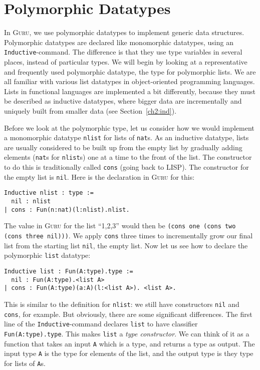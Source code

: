 \documentclass{book}[12pt]
\newcommand{\guru}[0]{\textsc{Guru}\xspace}
\begin{document}
\section{Polymorphic Datatypes}
\label{ch6:lists}

In \guru, we use polymorphic datatypes to implement generic data
structures.  Polymorphic datatypes are declared like monomorphic
datatypes, using an \texttt{Inductive}-command.  The difference is
that they use type variables in several places, instead of particular
types.  We will begin by looking at a representative and frequently
used polymorphic datatype, the type for polymorphic lists.  We are all
familiar with various list datatypes in object-oriented programming
languages.  Lists in functional languages are implemented a bit
differently, because they must be described as inductive datatypes,
where bigger data are incrementally and uniquely built from smaller
data (see Section~\ref{ch2:ind}).  

Before we look at the polymorphic type, let us consider how we would
implement a monomorphic datatype \texttt{nlist} for lists of
\texttt{nat}s.  As an inductive datatype, lists are usually considered
to be built up from the empty list by gradually adding elements
(\texttt{nat}s for \texttt{nlist}s) one at a time to the front of the
list.  The constructor to do this is traditionally called
\texttt{cons} (going back to \textsc{LISP}).  The constructor for the
empty list is \texttt{nil}.  Here is the declaration in \guru for
this:

\begin{verbatim}
Inductive nlist : type :=
  nil : nlist
| cons : Fun(n:nat)(l:nlist).nlist.
\end{verbatim}

\noindent The value in \guru for the list ``1,2,3'' would then be
\texttt{(cons one (cons two (cons three nil)))}.  We apply
\texttt{cons} three times to incrementally grow our final list from
the starting list \texttt{nil}, the empty list.  Now let us see how to
declare the polymorphic \texttt{list} datatype:

\begin{verbatim}
Inductive list : Fun(A:type).type :=
  nil : Fun(A:type).<list A>
| cons : Fun(A:type)(a:A)(l:<list A>). <list A>.
\end{verbatim}

\noindent This is similar to the definition for \texttt{nlist}: we
still have constructors \texttt{nil} and \texttt{cons}, for example.
But obviously, there are some significant differences.  The first line
of the \texttt{Inductive}-command declares \texttt{list} to have
classifier \texttt{Fun(A:type).type}.  This makes \texttt{list} a
\emph{type constructor}.  We can think of it as a function that takes
an input \texttt{A} which is a type, and returns a type as output.
The input type \texttt{A} is the type for elements of the list, and
the output type is they type for lists of \texttt{A}s.  
\end{document}
